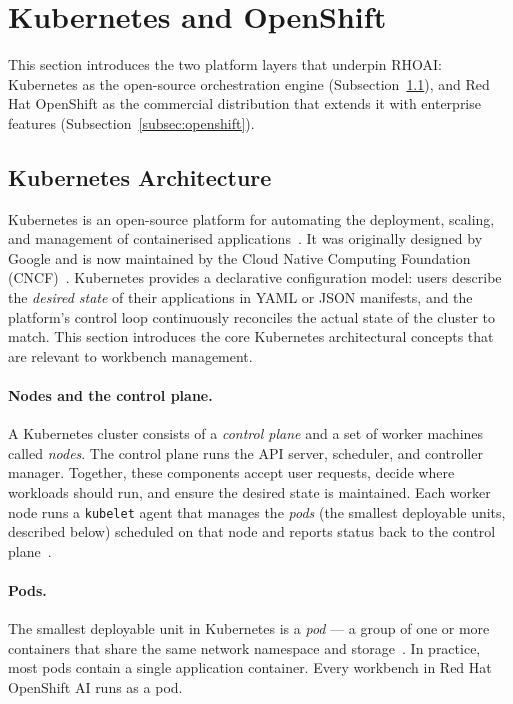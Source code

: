 \documentclass[
  digital,     %
  oneside,     %
  nosansbold,  %
  nocolorbold, %
  lof,         %
  lot,         %
]{fithesis4}
\begin{document}
\section{Kubernetes and OpenShift}
\label{sec:kubernetes}

This section introduces the two platform layers that underpin RHOAI:
Kubernetes as the open-source orchestration engine
(Subsection~\ref{subsec:kubernetes-arch}), and Red Hat OpenShift as the
commercial distribution that extends it with enterprise features
(Subsection~\ref{subsec:openshift}).

\subsection{Kubernetes Architecture}
\label{subsec:kubernetes-arch}

Kubernetes is an open-source platform for automating the deployment, scaling,
and management of containerised applications~\parencite{kubernetes-docs}. It
was originally designed by Google and is now maintained by the Cloud Native
Computing Foundation (CNCF)~\parencite{cncf}. Kubernetes provides a declarative configuration
model: users describe the \emph{desired state} of their applications in YAML or
JSON manifests, and the platform's control loop continuously reconciles the
actual state of the cluster to match. This section introduces the core Kubernetes
architectural concepts that are relevant to workbench management.

\paragraph{Nodes and the control plane.}
A Kubernetes cluster consists of a \emph{control plane} and a set of worker
machines called \emph{nodes}. The control plane runs the API server, scheduler,
and controller manager. Together, these components accept user requests, decide where
workloads should run, and ensure the desired state is maintained. Each worker
node runs a \texttt{kubelet} agent that manages the \emph{pods} (the smallest
deployable units, described below) scheduled on that node and reports status
back to the control plane~\parencite{kubernetes-docs}.

\paragraph{Pods.}
The smallest deployable unit in Kubernetes is a \emph{pod} --- a group of one
or more containers that share the same network namespace and
storage~\parencite{kubernetes-pods}. In practice, most pods contain a single
application container. Every workbench in Red Hat OpenShift AI runs
as a pod.
\end{document}
